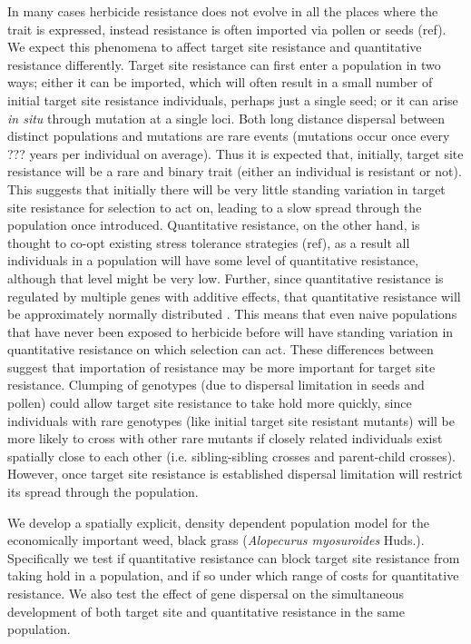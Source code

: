\documentclass[12pt, a4paper]{article}
\begin{document}
In many cases herbicide resistance does not evolve in all the places where the trait is expressed, instead resistance is often imported via pollen or seeds (ref). We expect this phenomena to affect target site resistance and quantitative resistance differently. Target site resistance can first enter a population in two ways; either it can be imported, which will often result in a small number of initial target site resistance individuals, perhaps just a single seed; or it can arise \textit{in situ} through mutation at a single loci. Both long distance dispersal between distinct populations and mutations are rare events (mutations occur once every ??? years per individual on average). Thus it is expected that, initially, target site resistance will be a rare and binary trait (either an individual is resistant or not). This suggests that initially there will be very little standing variation in target site resistance for selection to act on, leading to a slow spread through the population once introduced. Quantitative resistance, on the other hand, is thought to co-opt existing stress tolerance strategies (ref), as a result all individuals in a population will have some level of quantitative resistance, although that level might be very low. Further, since quantitative resistance is regulated by multiple genes with additive effects, that quantitative resistance will be approximately normally distributed \citep{Land1989, Mack2009, Rajo2013}. This means that even naive populations that have never been exposed to herbicide before will have standing variation in quantitative resistance on which selection can act. These differences between suggest that importation of resistance may be more important for target site resistance. Clumping of genotypes (due to dispersal limitation in seeds and pollen) could allow target site resistance to take hold more quickly, since individuals with rare genotypes (like initial target site resistant mutants) will be more likely to cross with other rare mutants if closely related individuals exist spatially close to each other (i.e. sibling-sibling crosses and parent-child crosses). However, once target site resistance is established dispersal limitation will restrict its spread through the population. 

We develop a spatially explicit, density dependent population model for the economically important weed, black grass (\textit{Alopecurus myosuroides} Huds.). Specifically we test if quantitative resistance can block target site resistance from taking hold in a population, and if so under which range of costs for quantitative resistance. We also test the effect of gene dispersal on the simultaneous development of both target site and quantitative resistance in the same population. 
\end{document}
